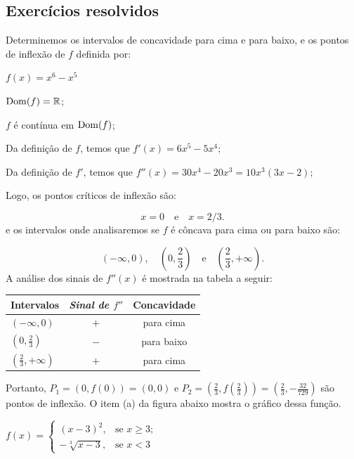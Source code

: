 \cleardoublepage\documentclass[../main.tex]{subfiles}
\begin{document}
\subsection{Exercícios resolvidos}
Determinemos os intervalos de concavidade para cima e para baixo, e os pontos de inflexão de \(f\) definida por:
\begin{compactenum}[a)]
\item \(f(x)=x^6-x^5\)

\begin{solution}
\begin{compactenum}[i.]
\item \({\rm Dom}(f)=\mathbb{R}\);
\item \(f\) é contínua em \({\rm Dom}(f)\);
\item Da definição de \(f\), temos que \(f'(x)=6x^5-5x^4\);
\item Da definição de \(f'\), temos que \(f''(x)=30x^4-20x^3=10x^3(3x-2)\);

Logo, os pontos críticos de inflexão são:

\[ x=0\quad \mbox{e} \quad x=2/3. \]
e os intervalos onde analisaremos se \(f\) é côncava para cima ou para baixo são:

\[ (-\infty, 0),\quad \left(0,\frac{2}{3}\right)\quad \mbox{e} \quad \left(\frac{2}{3},+\infty\right). \]
A análise dos sinais de \(f''(x)\) é mostrada na tabela a seguir:
\begin{center}
  \begin{tabular}{l|c|c}
  \toprule
    \textbf{Intervalos} &	\emph{Sinal de \(f''\)} &	\textbf{Concavidade}\\\hline
  \((-\infty, 0)\) &\(+\)& para cima\\\hline
  \(\left(0,\frac{2}{3}\right)\) &\(-\)&para baixo\\\hline
   \( \left(\frac{2}{3},+\infty\right)\) & \(+\) & para cima\\
    \bottomrule
  \end{tabular}
  \end{center}
\end{compactenum}
Portanto, \(P_1=(0,f(0))=(0,0)\) e \(P_2=\left(\frac{2}{3},f\left(\frac{2}{3}\right)\right)=\left(\frac{2}{3},-\frac{32}{729}\right)\) são pontos de inflexão. O item (a) da figura abaixo mostra o gráfico dessa função.
\end{solution}
\item \(f(x)=\left\{\begin{array}{ll} (x-3)^2 ,& \mbox{se } x\geq 3;\\ -\sqrt[3]{x-3} , & \mbox{se } x< 3 \end{array}\right.\)


\end{compactenum}
\end{document}
